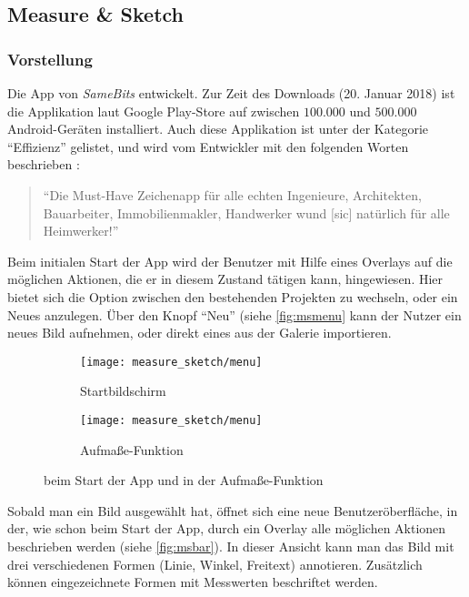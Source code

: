 \subsection{Measure \& Sketch}
\subsubsection{Vorstellung}
Die App \ms{} von \emph{SameBits} entwickelt.
Zur Zeit des Downloads (20. Januar 2018) ist die Applikation laut Google Play-Store auf zwischen $100.000$ und $500.000$ Android-Geräten installiert.
Auch diese Applikation ist unter der Kategorie ``Effizienz'' gelistet, und wird vom Entwickler mit den folgenden Worten beschrieben \citep{BitsMS}:

\begin{quote}
  ``Die Must-Have Zeichenapp für alle echten Ingenieure, Architekten, Bauarbeiter, Immobilienmakler, Handwerker wund [sic] natürlich für alle Heimwerker!''
\end{quote}

\noindent
Beim initialen Start der App wird der Benutzer mit Hilfe eines Overlays auf die möglichen Aktionen, die er in diesem Zustand tätigen kann, hingewiesen.
Hier bietet sich die Option zwischen den bestehenden Projekten zu wechseln, oder ein Neues anzulegen.
Über den Knopf ``Neu'' (siehe \autoref{fig:msmenu} kann der Nutzer ein neues Bild aufnehmen, oder direkt eines aus der Galerie importieren. \\

\begin{figure}[h]
  \centering
  \begin{subfigure}[t]{0.4\textwidth}
    \texttt{[image: measure\_sketch/menu]}
    \caption{Startbildschirm}
    \label{fig:msmenu}	
  \end{subfigure}
  \begin{subfigure}[t]{0.4\textwidth}
    \texttt{[image: measure\_sketch/menu]}
    \caption{Aufmaße-Funktion} 
    \label{fig:msbar}	
  \end{subfigure}
  \caption{\ms{} beim Start der App und in der Aufmaße-Funktion}
\end{figure}

\noindent
{}
Sobald man ein Bild ausgewählt hat, öffnet sich eine neue Benutzeröberfläche, in der, wie schon beim Start der App, durch ein Overlay alle möglichen Aktionen beschrieben werden (siehe \autoref{fig:msbar}).
In dieser Ansicht kann man das Bild mit drei verschiedenen Formen (Linie, Winkel, Freitext) annotieren. 
Zusätzlich können eingezeichnete Formen mit Messwerten beschriftet werden.\\

